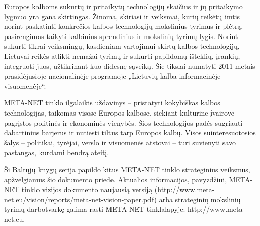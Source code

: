 \begin{multicols}{2}

Europos kalboms sukurtų ir pritaikytų technologijų skaičius ir jų pritaikymo lygmuo yra gana skirtingas. Žinoma, skiriasi ir veiksmai, kurių reikėtų imtis norint paskatinti konkrečios kalbos technologijų mokslinius tyrimus ir plėtrą, pasirengimas taikyti kalbinius sprendinius ir mokslinių tyrimų lygis. Norint sukurti tikrai veiksmingų, kasdieniam vartojimui skirtų kalbos technologijų, Lietuvai reikės atlikti nemažai tyrimų ir sukurti papildomų išteklių, įrankių, integruoti juos, užtikrinant kuo didesnę sąveiką. Šie tikslai numatyti 2011 metais prasidėjusioje nacionalinėje programoje „Lietuvių kalba informacinėje visuomenėje“.

META-NET tinklo ilgalaikis uždavinys – pristatyti kokybiškas kalbos technologijas, taikomas visose Europos kalbose, siekiant kultūrine įvairove pagrįstos politinės ir ekonominės vienybės. Šios technologijos padės sugriauti dabartinius barjerus ir nutiesti tiltus tarp Europos kalbų. Visos suinteresuotosios šalys – politikai, tyrėjai, verslo ir visuomenės atstovai – turi suvienyti savo pastangas, kurdami bendrą ateitį.

Ši Baltųjų knygų serija papildo kitus META-NET tinklo strateginius veiksmus, apžvelgiamus šio dokumento priede. Aktualios informacijos, pavyzdžiui, META-NET tinklo vizijos dokumento naujausią versiją (http://www.meta-net.eu/vision/reports/meta-net-vision-paper.pdf) arba strateginių mokslinių tyrimų darbotvarkę galima rasti META-NET tinklalapyje: http://www.meta-net.eu.
\end{multicols}

\clearpage



